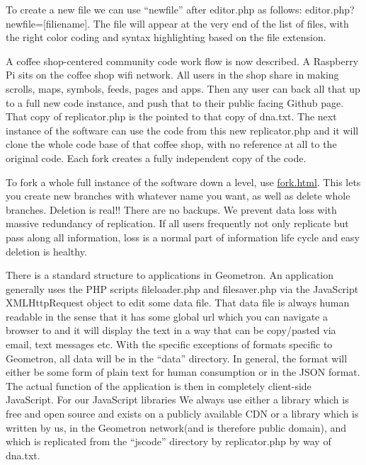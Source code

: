 To create a new file we can use ``newfile'' after editor.php as follows:
editor.php?newfile={[}filiename{]}. The file will appear at the very end
of the list of files, with the right color coding and syntax
highlighting based on the file extension.

A coffee shop-centered community code work flow is now described. A
Raspberry Pi sits on the coffee shop wifi network. All users in the shop
share in making scrolls, maps, symbols, feeds, pages and apps. Then any
user can back all that up to a full new code instance, and push that to
their public facing Github page. That copy of replicator.php is the
pointed to that copy of dna.txt. The next instance of the software can
use the code from this new replicator.php and it will clone the whole
code base of that coffee shop, with no reference at all to the original
code. Each fork creates a fully independent copy of the code.

To fork a whole full instance of the software down a level, use
\url{fork.html}. This lets you create new branches with whatever name
you want, as well as delete whole branches. Deletion is real!! There are
no backups. We prevent data loss with massive redundancy of replication.
If all users frequently not only replicate but pass along all
information, loss is a normal part of information life cycle and easy
deletion is healthy.

There is a standard structure to applications in Geometron.  An application generally uses the PHP scripts fileloader.php and filesaver.php via the JavaScript XMLHttpRequest object to edit some data file.  That data file is always human readable in the sense that it has some global url which you can navigate a browser to and it will display the text in a way that can be copy/pasted via email, text messages etc. With the specific exceptions of formats specific to Geometron, all data will be in the ``data'' directory.  In general, the format will either be some form of plain text for human consumption or in the JSON format.  The actual function of the application is then in completely client-side JavaScript.  For our JavaScript libraries We always use either a library which is free and open source and exists on a publicly available CDN or a library which is written by us, in the Geometron network(and is therefore public domain), and which is replicated from the ``jscode'' directory by replicator.php by way of dna.txt.   

